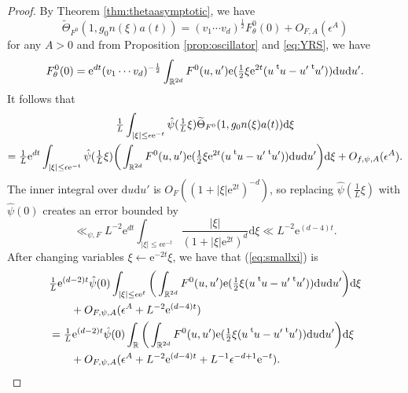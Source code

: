 \documentclass[10pt,a4paper]{amsart}
\newcommand{\R}{\mathbb{R}}
\newcommand{\dd}{\mathrm{d}}
\newcommand{\e}{\mathrm{e}}
\newcommand*{\transp}[2][-1mu]{\ensuremath{\mskip1mu\prescript{\smash{\mathrm t\mkern#1}}{}{\mathstrut#2}}}
\begin{document}
\begin{proof}
By Theorem \ref{thm:thetaasymptotic}, we have
\begin{equation}
  \label{eq:Thetaasymptotic}
  \widetilde\Theta_{F^0}( 1, g_0 n(\xi) a(t ))  = ( v_1 \cdots v_d)^{\frac{1}{2}} F^0_\theta(0) + O_{F, A}(\epsilon^A)
\end{equation}
for any $A > 0$ and from Proposition \ref{prop:oscillator} and \eqref{eq:YRS}, we have
\begin{equation}
  \label{eq:fQ0}
  F^0_\theta(0) = \e^{dt} (v_1 \cdots v_d)^{-\frac{1}{2}} \int_{\mathbb{R}^{2d}} F^0(u,u') \e( \tfrac{1}{2} \xi \e^{2t} (u\transp{u}-u'\transp{u}') ) \dd u \dd u'.
\end{equation}
It follows that
\begin{multline}
  \label{eq:smallxi}
  \tfrac{1}{L} \int_{|\xi|\leq \epsilon \e^{-t}} \hat{\psi} ( \tfrac{1}{L}\xi ) \widetilde\Theta_{F^0}(1, g_0 n(\xi) a(t) ) \dd \xi \\
  = \tfrac{1}{L}\e^{dt} \int_{|\xi| \leq \epsilon \e^{-t}} \hat{\psi}( \tfrac{1}{L}\xi)  \bigg( \int_{\mathbb{R}^{2d}} F^0(u,u') \e( \tfrac{1}{2} \xi \e^{2t} (u\transp{u}-u'\transp{u}') ) \dd u \dd u'\bigg)  \dd \xi + O_{f, \psi, A}(\epsilon^A).
\end{multline}
The inner integral over $\dd u \dd u'$ is $O_{F}( (1 + |\xi| \e^{2t})^{-d})$, so replacing $\hat \psi(\tfrac{1}{L} \xi)$ with $\hat \psi(0)$ creates an error bounded by
\begin{equation}
  \label{eq:psi0replace}
  \ll_{\psi, F} L^{-2} \e^{dt} \int_{|\xi| \leq \epsilon \e^{-t}} \frac{ |\xi|}{(1 + |\xi| \e^{2t})^d} \dd \xi \ll L^{-2} \e^{(d-4)t}. 
\end{equation}
After changing variables $\xi \gets \e^{-2t} \xi$, we have that (\ref{eq:smallxi}) is 
\begin{equation}
\begin{split}
  \label{eq:smallxi1}
&\tfrac{1}{L} \e^{(d-2)t} \hat\psi(0)  \int_{|\xi| \leq \epsilon \e^{t}} \bigg( \int_{\mathbb{R}^{2d}} F^0(u,u') \e( \tfrac{1}{2} \xi (u\transp{u}-u'\transp{u}') ) \dd u \dd u'\bigg)  \dd \xi \\
&  \qquad + O_{F,\psi,A}(\epsilon^{A} + L^{-2} \e^{(d-4)t})\\
& = \tfrac{1}{L} \e^{(d-2)t} \hat \psi(0)  \int_\R \bigg( \int_{\mathbb{R}^{2d}} F^0(u,u') \e( \tfrac{1}{2} \xi (u\transp{u}-u'\transp{u}') ) \dd u \dd u'\bigg)  \dd \xi \\
 & \qquad + O_{F,\psi, A}(\epsilon^{A} + L^{-2} \e^{(d-4)t} + L^{-1} \epsilon^{-d + 1} \e^{-t}).
\end{split}

\end{equation}
\end{proof}
\end{document}
